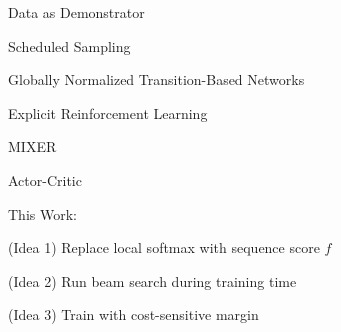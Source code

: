 \documentclass{beamer}
\let\tempone\itemize
\let\temptwo\enditemize
\renewenvironment{itemize}{\tempone\addtolength{\itemsep}{0.5\baselineskip}}{\temptwo}
\newcommand{\air}{\vspace{0.25cm}}
\newcommand{\Cite}[1]{{\footnotesize \citep{#1}}}
\begin{document}
\begin{frame}
  \centerline{ }
  \air 
  \begin{itemize}
  \item Data as Demonstrator \Cite{Venkatraman}
  \item Scheduled Sampling \Cite{Bengio2015}
  \item Globally Normalized Transition-Based Networks \Cite{Andor2016}
  \end{itemize}
  \air 

  \centerline{Explicit Reinforcement Learning}
  \air 
  \begin{itemize}
  \item MIXER \Cite{Ranzato2016}
  \item Actor-Critic \Cite{Bahdanau2016}
  \end{itemize}
  


\end{frame}


\begin{frame}
  \begin{center}
    This Work: 
  \end{center}


  
  \begin{itemize}

  \item (Idea 1) Replace local softmax with sequence score $f$ 
    \air 
  \item (Idea 2) Run beam search during training time
    \air 

  \item (Idea 3) Train with cost-sensitive margin 
  \end{itemize}
\end{frame}
\end{document}

